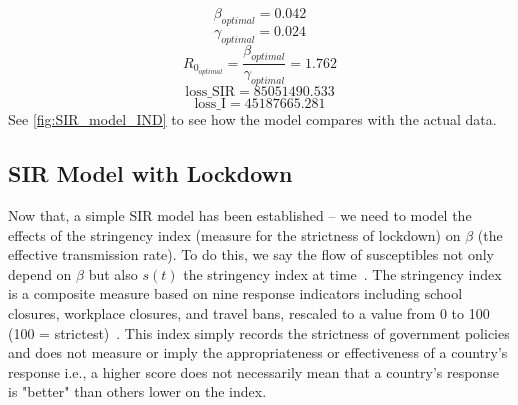 \documentclass[tikz,fleqn,12pt]{wlscirep}
\begin{document}
\begin{equation}
  \beta_{optimal} = 0.042
  \label{eq:beta_optimal_without_lockdown}
\end{equation}
\begin{equation}
  \gamma_{optimal} = 0.024
  \label{eq:gamma_optimal_without_lockdown}
\end{equation}
\begin{equation}
  R_{0_{optimal}} = \frac{\beta_{optimal}}{\gamma_{optimal}} = 1.762
  \label{eq:r0_without_lockdown}
\end{equation}
\begin{equation}
  \textrm{loss\_SIR} = 85051490.533
  \label{eq:cost_SIR_without_lockdown}
\end{equation}
\begin{equation}
  \textrm{loss\_I} = 45187665.281
  \label{eq:cost_I_without_lockdown}
\end{equation}
See \cref{fig:SIR_model_IND} to see how the model compares with the actual data.

\subsection{SIR Model with Lockdown}
Now that, a simple SIR model has been established -- we need to model the effects of the stringency index (measure for the strictness of lockdown) on $\beta$ (the effective transmission rate). To do this, we say the flow of susceptibles not only depend on $\beta$ but also $s(t)$ the stringency index at time~\cite{NBERw26867,AlvarezLockdownSIR,SIRLockdown,SIRLockdown2,analytical_covid_lockdown_model}. The stringency index is a composite measure based on nine response indicators including school closures, workplace closures, and travel bans, rescaled to a value from 0 to 100 (100 = strictest)~\cite{owidcoronavirus}. This index simply records the strictness of government policies and does not measure or imply the appropriateness or effectiveness of a country's response i.e., a higher score does not necessarily mean that a country's response is "better" than others lower on the index.
\end{document}
